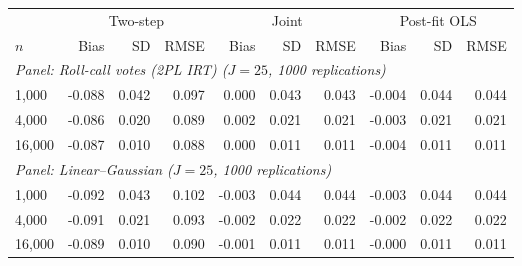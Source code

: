 \begin{tabular}{lrrrrrrrrr}
\toprule
 & \multicolumn{3}{c}{Two-step} & \multicolumn{3}{c}{Joint} & \multicolumn{3}{c}{Post-fit OLS} \\
\cmidrule(lr){2-4}\cmidrule(lr){5-7}\cmidrule(lr){8-10}
$n$ & Bias & SD & RMSE & Bias & SD & RMSE & Bias & SD & RMSE \\
\midrule
\multicolumn{10}{l}{\emph{Panel: Roll-call votes (2PL IRT) ($J=25$, 1000 replications)}} \\
1,000 & -0.088 & 0.042 & 0.097 & 0.000 & 0.043 & 0.043 & -0.004 & 0.044 & 0.044 \\
4,000 & -0.086 & 0.020 & 0.089 & 0.002 & 0.021 & 0.021 & -0.003 & 0.021 & 0.021 \\
16,000 & -0.087 & 0.010 & 0.088 & 0.000 & 0.011 & 0.011 & -0.004 & 0.011 & 0.011 \\
\midrule
\multicolumn{10}{l}{\emph{Panel: Linear--Gaussian ($J=25$, 1000 replications)}} \\
1,000 & -0.092 & 0.043 & 0.102 & -0.003 & 0.044 & 0.044 & -0.003 & 0.044 & 0.044 \\
4,000 & -0.091 & 0.021 & 0.093 & -0.002 & 0.022 & 0.022 & -0.002 & 0.022 & 0.022 \\
16,000 & -0.089 & 0.010 & 0.090 & -0.001 & 0.011 & 0.011 & -0.000 & 0.011 & 0.011 \\
\bottomrule
\end{tabular}
